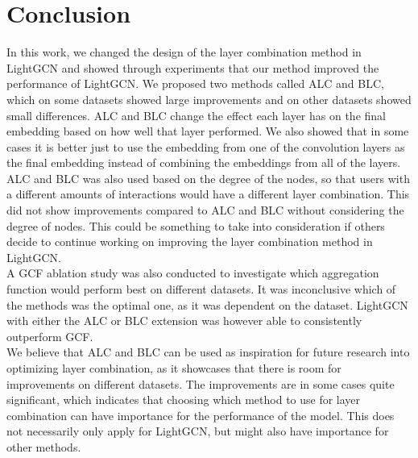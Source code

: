 \section{Conclusion}
In this work, we changed the design of the layer combination method in LightGCN and showed through experiments that our method improved the performance of LightGCN.
We proposed two methods called ALC and BLC, which on some datasets showed large improvements and on other datasets showed small differences.
ALC and BLC change the effect each layer has on the final embedding based on how well that layer performed.
We also showed that in some cases it is better just to use the embedding from one of the convolution layers as the final embedding instead of combining the embeddings from all of the layers.
ALC and BLC was also used based on the degree of the nodes, so that users with a different amounts of interactions would have a different layer combination.
This did not show improvements compared to ALC and BLC without considering the degree of nodes.
This could be something to take into consideration if others decide to continue working on improving the layer combination method in LightGCN.\\
A GCF ablation study was also conducted to investigate which aggregation function would perform best on different datasets.
It was inconclusive which of the methods was the optimal one, as it was dependent on the dataset.
LightGCN with either the ALC or BLC extension was however able to consistently outperform GCF.\\
We believe that ALC and BLC can be used as inspiration for future research into optimizing layer combination, as it showcases that there is room for improvements on different datasets.
The improvements are in some cases quite significant, which indicates that choosing which method to use for layer combination can have importance for the performance of the model.
This does not necessarily only apply for LightGCN, but might also have importance for other methods.
